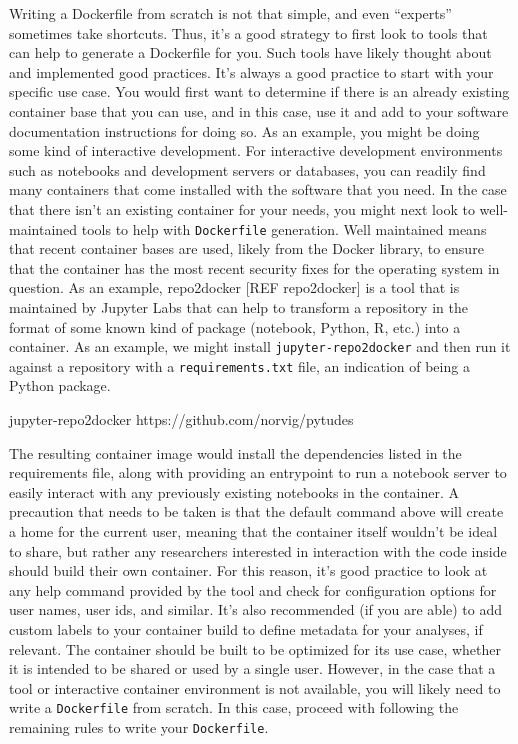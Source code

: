 \documentclass[10pt,letterpaper]{article}
\newenvironment{Shaded}{\begin{snugshade}}{\end{snugshade}}
\newcommand{\ExtensionTok}[1]{#1}
\newcommand{\NormalTok}[1]{#1}
\begin{document}
Writing a Dockerfile from scratch is not that simple, and even
``experts'' sometimes take shortcuts. Thus, it's a good strategy to
first look to tools that can help to generate a Dockerfile for you. Such
tools have likely thought about and implemented good practices. It's
always a good practice to start with your specific use case. You would
first want to determine if there is an already existing container base
that you can use, and in this case, use it and add to your software
documentation instructions for doing so. As an example, you might be
doing some kind of interactive development. For interactive development
environments such as notebooks and development servers or databases, you
can readily find many containers that come installed with the software
that you need. In the case that there isn't an existing container for
your needs, you might next look to well-maintained tools to help with
\texttt{Dockerfile} generation. Well maintained means that recent
container bases are used, likely from the Docker library, to ensure that
the container has the most recent security fixes for the operating
system in question. As an example, repo2docker {[}REF repo2docker{]} is
a tool that is maintained by Jupyter Labs that can help to transform a
repository in the format of some known kind of package (notebook,
Python, R, etc.) into a container. As an example, we might install
\texttt{jupyter-repo2docker} and then run it against a repository with a
\texttt{requirements.txt} file, an indication of being a Python package.

\begin{Shaded}
\begin{Highlighting}[]
\ExtensionTok{jupyter-repo2docker}\NormalTok{ https://github.com/norvig/pytudes}
\end{Highlighting}
\end{Shaded}

The resulting container image would install the dependencies listed in
the requirements file, along with providing an entrypoint to run a
notebook server to easily interact with any previously existing
notebooks in the container. A precaution that needs to be taken is that
the default command above will create a home for the current user,
meaning that the container itself wouldn't be ideal to share, but rather
any researchers interested in interaction with the code inside should
build their own container. For this reason, it's good practice to look
at any help command provided by the tool and check for configuration
options for user names, user ids, and similar. It's also recommended (if
you are able) to add custom labels to your container build to define
metadata for your analyses, if relevant. The container should be built
to be optimized for its use case, whether it is intended to be shared or
used by a single user. However, in the case that a tool or interactive
container environment is not available, you will likely need to write a
\texttt{Dockerfile} from scratch. In this case, proceed with following
the remaining rules to write your \texttt{Dockerfile}.
\end{document}
